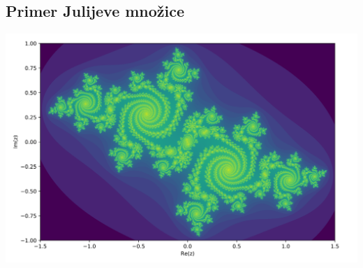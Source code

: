 \documentclass{beamer}
\begin{document}
\begin{frame}
    \subsection*{Primer Julijeve množice}

    \begin{center}
        \includegraphics{julia_set.png}
    \end{center}
\end{frame}
\end{document}
